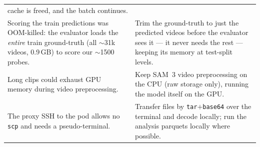 \documentclass[11pt]{article}
\begin{document}
\begin{table}[h]
\begin{tabularx}{\textwidth}{p{4.3cm}Y}
cache is freed, and the batch continues. \\
\addlinespace
Scoring the train predictions was OOM-killed: the evaluator loads the \emph{entire} train ground-truth
(all $\sim$31k videos, 0.9\,GB) to score our $\sim$1500 probes. &
Trim the ground-truth to just the predicted videos before the evaluator sees it --- it never needs the
rest --- keeping its memory at test-split levels. \\
\addlinespace
Long clips could exhaust GPU memory during video preprocessing. &
Keep SAM~3 video preprocessing on the CPU (raw storage only), running the model itself on the GPU. \\
\addlinespace
The proxy SSH to the pod allows no \texttt{scp} and needs a pseudo-terminal. &
Transfer files by \texttt{tar}$+$\texttt{base64} over the terminal and decode locally; run the analysis
parquets locally where possible. \\
\bottomrule
\end{tabularx}
\end{table}
\end{document}
